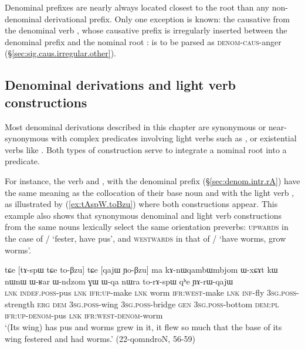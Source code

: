 Denominal prefixes are nearly always located closest to the root than any non-denominal derivational prefix. Only one exception is known: the causative  from the denominal verb , whose causative prefix is irregularly inserted between the denominal prefix  and the nominal root :  is to be parsed as  \textsc{denom}-\textsc{caus}-anger  (§\ref{sec:sig.caus.irregular.other}).

\subsection{Denominal derivations and light verb constructions} \label{sec:denominal.vs.light.verb}
Most denominal derivations described in this chapter are synonymous or near-synonymous with complex predicates involving light verbs such as ,  or existential verbs like . Both types of construction serve to integrate a nominal root into a predicate. 
 
For instance, the verb  and  , with the  denominal prefix (§\ref{sec:denom.intr.rA}) have the same meaning as the collocation of their base noun  and  with the light verb , as illustrated by (\ref{ex:tAspW.toBzu}) where both constructions appear. This example also shows that synonymous denominal and light verb constructions from the same nouns lexically select the same orientation preverbs: \textsc{upwards} in the case of / `fester, have pus', and \textsc{westwards} in that of / `have worms, grow worms'.
 
 \begin{exe}
\ex \label{ex:tAspW.toBzu}
 \gll tɕe [tɤ-spɯ tɕe to-βzu] tɕe [qajɯ ɲo-βzu] ma kɤ-nɯqambɯmbjom ɯ-xɕɤt kɯ nɯnɯ ɯ-ʁar ɯ-ndzom ɣɯ ɯ-qa nɯra to-rɤ-spɯ qʰe ɲɤ-rɯ-qajɯ \\
 \textsc{lnk} \textsc{indef}.\textsc{poss}-pus \textsc{lnk} \textsc{ifr}:\textsc{up}-make \textsc{lnk} worm \textsc{ifr}:\textsc{west}-make \textsc{lnk} \textsc{inf}-fly \textsc{3sg}.\textsc{poss}-strength \textsc{erg} \textsc{dem} \textsc{3sg}.\textsc{poss}-wing \textsc{3sg}.\textsc{poss}-bridge \textsc{gen} \textsc{3sg}.\textsc{poss}-bottom \textsc{dem}:\textsc{pl} \textsc{ifr}:\textsc{up}-\textsc{denom}-pus \textsc{lnk} \textsc{ifr}:\textsc{west}-\textsc{denom}-worm \\
\glt `(Its wing) has pus and worms grew in it, it flew so much that the base of its wing festered and had worms.' (22-qomndroN, 56-59)
  \end{exe}
  
